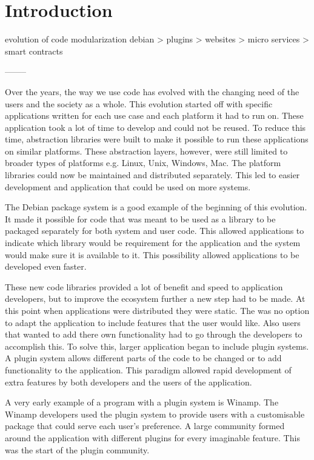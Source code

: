 \chapter{Introduction}

evolution of code modularization
debian > plugins > websites > micro services > smart contracts

--------

Over the years, the way we use code has evolved with the changing need of the users and the society as a whole. This evolution started off with specific applications written for each use case and each platform it had to run on. These application took a lot of time to develop and could not be reused. To reduce this time, abstraction libraries were built to make it possible to run these applications on similar platforms. These abstraction layers, however, were still limited to broader types of platforms e.g. Linux, Unix, Windows, Mac. The platform libraries could now be maintained and distributed separately. This led to easier development and application that could be used on more systems.

The Debian package system is a good example of the beginning of this evolution. It made it possible for code that was meant to be used as a library to be packaged separately for both system and user code. This allowed applications to indicate which library would be requirement for the application and the system would make sure it is available to it. This possibility allowed applications to be developed even faster.

These new code libraries provided a lot of benefit and speed to application developers, but to improve the ecosystem further a new step had to be made. At this point when applications were distributed they were static. The was no option to adapt the application to include features that the user would like. Also users that wanted to add there own functionality had to go through the developers to accomplish this. To solve this, larger application began to include plugin systems. A plugin system allows different parts of the code to be changed or to add functionality to the application. This paradigm allowed rapid development of extra features by both developers and the users of the application.

A very early example of a program with a plugin system is Winamp. The Winamp developers used the plugin system to provide users with a customisable package that could serve each user's preference. A large community formed around the application with different plugins for every imaginable feature. This was the start of the plugin community.

